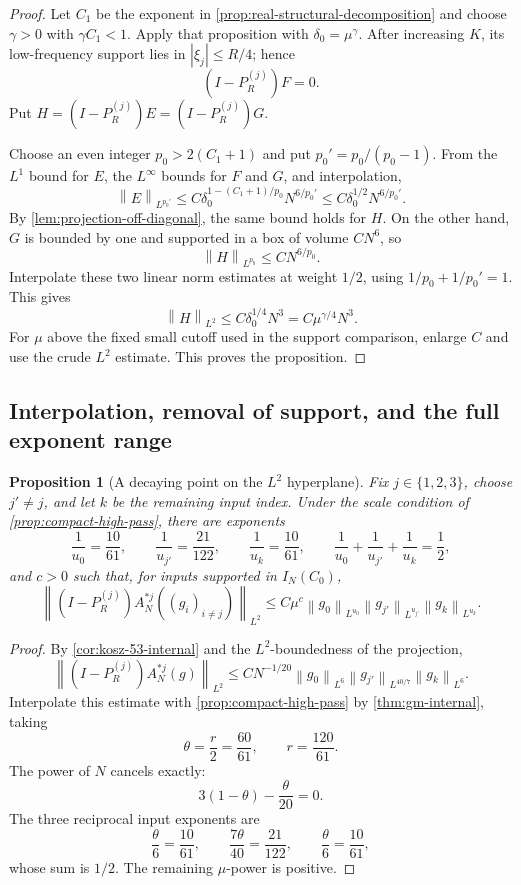 \documentclass[11pt]{article}
\newtheorem{proposition}[theorem]{Proposition}
\newcommand{\norm}[2]{\left\lVert #1\right\rVert_{#2}}
\newcommand{\abs}[1]{\left|#1\right|}
\newcommand{\indices}{\{1,2,3\}}
\begin{document}
	\begin{proof}
		Let \(C_1\) be the exponent in
		\cref{prop:real-structural-decomposition} and choose
		\(\gamma>0\) with \(\gamma C_1<1\).  Apply that proposition with
		\(\delta_0=\mu^\gamma\).  After increasing \(K\), its low-frequency support lies in
		\(\abs{\xi_j}\leq R/4\); hence
		\[
		(I-P_R^{(j)})F=0.
		\]
		Put \(H=(I-P_R^{(j)})E=(I-P_R^{(j)})G\).
		
		Choose an even integer \(p_0>2(C_1+1)\) and put
		\(p_0'=p_0/(p_0-1)\).  From the \(L^1\) bound for \(E\), the
		\(L^\infty\) bounds for \(F\) and \(G\), and interpolation,
		\[
		\norm E{L^{p_0'}}
		\leq C\delta_0^{1-(C_1+1)/p_0}N^{6/p_0'}
		\leq C\delta_0^{1/2}N^{6/p_0'}.
		\]
		By \cref{lem:projection-off-diagonal}, the same bound holds for \(H\).
		On the other hand, \(G\) is bounded by one and supported in a box of volume \(CN^6\), so
		\[
		\norm H{L^{p_0}}\leq CN^{6/p_0}.
		\]
		Interpolate these two linear norm estimates at weight \(1/2\), using
		\(1/p_0+1/p_0'=1\).  This gives
		\[
		\norm H{L^2}\leq C\delta_0^{1/4}N^3
		=C\mu^{\gamma/4}N^3.
		\]
		For \(\mu\) above the fixed small cutoff used in the support comparison, enlarge \(C\) and use the crude \(L^2\) estimate.  This proves the proposition.
	\end{proof}
	
	\subsection{Interpolation, removal of support, and the full exponent range}
	
	\begin{proposition}[A decaying point on the \(L^2\) hyperplane]\label{prop:l2-decaying-point}
		Fix \(j\in\indices\), choose \(j'\neq j\), and let \(k\) be the remaining input index.  Under the scale condition of \cref{prop:compact-high-pass}, there are exponents
		\[
		\frac1{u_0}=\frac{10}{61},\qquad
		\frac1{u_{j'}}=\frac{21}{122},\qquad
		\frac1{u_k}=\frac{10}{61},
		\qquad
		\frac1{u_0}+\frac1{u_{j'}}+\frac1{u_k}=\frac12,
		\]
		and \(c>0\) such that, for inputs supported in \(I_N(C_0)\),
		\[
		\norm{(I-P_R^{(j)})A_N^{*j}((g_i)_{i\neq j})}{L^2}
		\leq C\mu^c
		\norm{g_0}{L^{u_0}}
		\norm{g_{j'}}{L^{u_{j'}}}
		\norm{g_k}{L^{u_k}}.
		\]
	\end{proposition}
	
	\begin{proof}
		By \cref{cor:kosz-53-internal} and the \(L^2\)-boundedness of the projection,
		\[
		\norm{(I-P_R^{(j)})A_N^{*j}(g)}{L^2}
		\leq
		CN^{-1/20}\norm{g_0}{L^6}
		\norm{g_{j'}}{L^{40/7}}\norm{g_k}{L^6}.
		\]
		Interpolate this estimate with \cref{prop:compact-high-pass} by
		\cref{thm:gm-internal}, taking
		\[
		\theta=\frac{r}{2}=\frac{60}{61},
		\qquad r=\frac{120}{61}.
		\]
		The power of \(N\) cancels exactly:
		\[
		3(1-\theta)-\frac{\theta}{20}=0.
		\]
		The three reciprocal input exponents are
		\[
		\frac{\theta}{6}=\frac{10}{61},\qquad
		\frac{7\theta}{40}=\frac{21}{122},\qquad
		\frac{\theta}{6}=\frac{10}{61},
		\]
		whose sum is \(1/2\).  The remaining \(\mu\)-power is positive.
	\end{proof}
	
\end{document}
